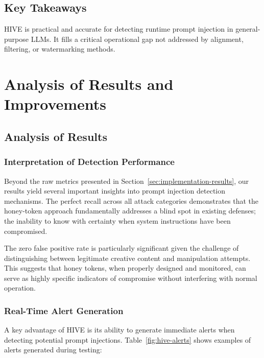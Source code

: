 \documentclass[manuscript,screen,review]{acmart}
\begin{document}
\subsection{Key Takeaways}
HIVE is practical and accurate for detecting runtime prompt injection in general-purpose LLMs. It fills a critical operational gap not addressed by alignment, filtering, or watermarking methods.

\section{Analysis of Results and Improvements}
\label{sec:results-improvements}

\subsection{Analysis of Results}
\subsubsection{Interpretation of Detection Performance}

Beyond the raw metrics presented in Section~\ref{sec:implementation-results}, our results yield several important insights into prompt injection detection mechanisms. The perfect recall across all attack categories demonstrates that the honey-token approach fundamentally addresses a blind spot in existing defenses; the inability to know with certainty when system instructions have been compromised.

The zero false positive rate is particularly significant given the challenge of distinguishing between legitimate creative content and manipulation attempts. This suggests that honey tokens, when properly designed and monitored, can serve as highly specific indicators of compromise without interfering with normal operation.

\subsubsection{Real-Time Alert Generation}
A key advantage of HIVE is its ability to generate immediate alerts when detecting potential prompt injections. Table~\ref{fig:hive-alerts} shows examples of alerts generated during testing:
\end{document}
